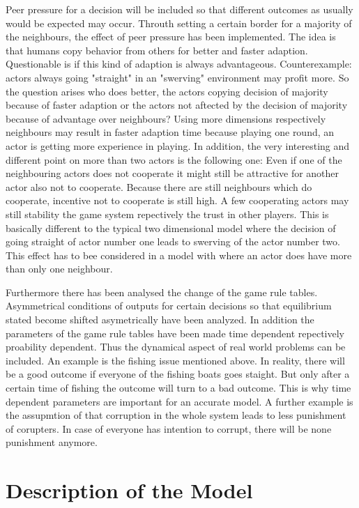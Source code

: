 \documentclass[11pt]{article}
\begin{document}
Peer pressure for a decision will be included so that different outcomes as usually would be expected may occur. Throuth setting a certain border for a majority of the neighbours, the effect of peer pressure has been implemented. The idea is that humans copy behavior from others for better and faster adaption. Questionable is if this kind of adaption is always advantageous. Counterexample: actors always going "straight" in an "swerving" environment may profit more. So the question arises who does better, the actors copying decision of majority because of faster adaption or the actors not aftected by the decision of majority because of advantage over neighbours?
\newline
Using more dimensions respectively neighbours may result in faster adaption time because playing one round, an actor is getting more experience in playing. In addition, the very interesting and different point on more than two actors is the following one: Even if one of the neighbouring actors does not cooperate it might still be attractive for another actor also not to cooperate. Because there are still neighbours which do cooperate, incentive not to cooperate is still high. A few cooperating actors may still stability the game system repectively the trust in other players. This is basically different to the typical two dimensional model where the decision of going straight of actor number one leads to swerving of the actor number two. This effect has to bee considered in a model with where an actor does have more than only one neighbour.
\newline

Furthermore there has been analysed the change of the game rule tables. Asymmetrical conditions of outputs for certain decisions so that equilibrium stated become shifted asymetrically have been analyzed. In addition the parameters of the game rule tables have been made time dependent repectively proability dependent. Thus the dynamical aspect of real world problems can be included. An example is the fishing issue mentioned above. In reality, there will be a good outcome if everyone of the fishing boats goes staight. But only after a certain time of fishing the outcome will turn to a bad outcome. This is why time dependent parameters are important for an accurate model.
A further example is the assupmtion of that corruption in the whole system leads to less punishment of corupters. In case of everyone has intention to corrupt, there will be none punishment anymore.


\section{Description of the Model}
\end{document}
